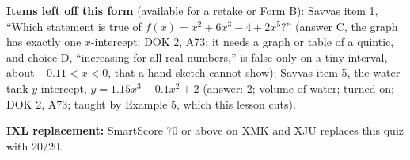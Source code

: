 \documentclass[11pt]{article}
\begin{document}
\textbf{Items left off this form} (available for a retake or Form B): Savvas item 1, ``Which statement is true of $f(x)=x^2+6x^3-4+2x^5$?'' (answer C, the graph has exactly one $x$-intercept; DOK 2, A73; it needs a graph or table of a quintic, and choice D, ``increasing for all real numbers,'' is false only on a tiny interval, about $-0.11<x<0$, that a hand sketch cannot show); Savvas item 5, the water-tank $y$-intercept, $y=1.15x^3-0.1x^2+2$ (answer: 2; volume of water; turned on; DOK 2, A73; taught by Example 5, which this lesson cuts).

\textbf{IXL replacement:} SmartScore 70 or above on XMK and XJU replaces this quiz with 20/20.
\end{document}
